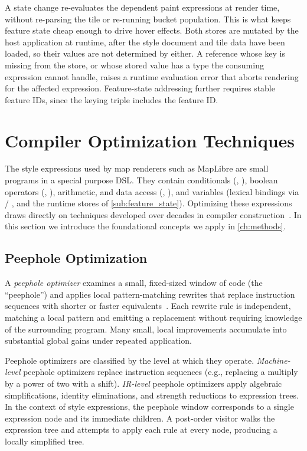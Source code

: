 A state change re-evaluates the dependent paint expressions at render time, without re-parsing the tile or re-running bucket population.
This is what keeps feature state cheap enough to drive hover effects.
Both stores are mutated by the host application at runtime, after the style document and tile data have been loaded, so their values are not determined by either.
A reference whose key is missing from the store, or whose stored value has a type the consuming expression cannot handle, raises a runtime evaluation error that aborts rendering for the affected expression.
Feature-state addressing further requires stable feature IDs, since the keying triple includes the feature ID.

\section{Compiler Optimization Techniques}\label{sec:compiler_optimizations}

The style expressions used by map renderers such as MapLibre are small programs in a special purpose \ac{DSL}.
They contain conditionals (, ), boolean operators (, ), arithmetic, and data access (, ), and variables (lexical bindings via / , and the runtime stores of \cref{sub:feature_state}).
Optimizing these expressions draws directly on techniques developed over decades in compiler construction~\cite{ahoCompilersPrinciplesTechniques2007}.
In this section we introduce the foundational concepts we apply in \cref{ch:methods}.

\subsection{Peephole Optimization}

\begin{sloppypar}
A \emph{peephole optimizer} examines a small, fixed-sized window of code (the \enquote{peephole}) and applies local pattern-matching rewrites that replace instruction sequences with shorter or faster equivalents~\cite{davidsonCodeSelectionObject1984}.
Each rewrite rule is independent, matching a local pattern and emitting a replacement without requiring knowledge of the surrounding program.
Many small, local improvements accumulate into substantial global gains under repeated application.
\end{sloppypar}

Peephole optimizers are classified by the level at which they operate.
\emph{Machine-level} peephole optimizers replace instruction sequences (e.g., replacing a multiply by a power of two with a shift).
\emph{\ac{IR}-level} peephole optimizers apply algebraic simplifications, identity eliminations, and strength reductions to expression trees.
In the context of style expressions, the peephole window corresponds to a single expression node and its immediate children.
A post-order visitor walks the expression tree and attempts to apply each rule at every node, producing a locally simplified tree.

